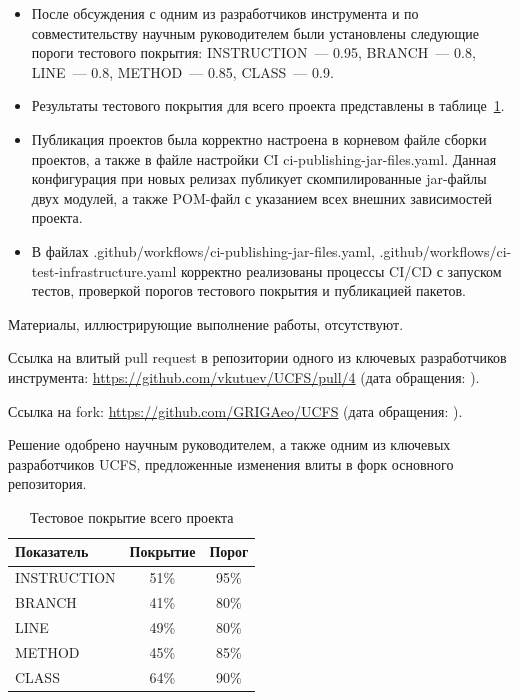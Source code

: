 \documentclass[a4paper]{article}
\begin{document}
\begin{itemize}
    \item После обсуждения с одним из разработчиков инструмента и по совместительству научным руководителем были установлены следующие пороги тестового покрытия: INSTRUCTION~--- 0.95, BRANCH~--- 0.8, LINE~--- 0.8, METHOD~--- 0.85, CLASS~--- 0.9.
    \item Результаты тестового покрытия для всего проекта представлены в таблице~\ref{tab:solver-coverage}.
    \item Публикация проектов была корректно настроена в корневом файле сборки проектов, а также в файле настройки CI ci-publishing-jar-files.yaml. Данная конфигурация при новых релизах публикует скомпилированные jar-файлы двух модулей, а также POM-файл с указанием всех внешних зависимостей проекта.
    \item В файлах .github/workflows/ci-publishing-jar-files.yaml, .github/workflows/ci-test-infrastructure.yaml корректно реализованы процессы CI/CD с запуском тестов, проверкой порогов тестового покрытия и публикацией пакетов. 
\end{itemize}

Материалы, иллюстрирующие выполнение работы, отсутствуют.

Ссылка на влитый pull request в репозитории одного из ключевых разработчиков инструмента: \url{https://github.com/vkutuev/UCFS/pull/4} (дата обращения: ).

Ссылка на fork: \url{https://github.com/GRIGAeo/UCFS} (дата обращения: ).

Решение одобрено научным руководителем, а также одним из ключевых разработчиков UCFS, предложенные изменения влиты в форк основного репозитория.

\begin{table}[H]
\centering
\begin{tabular}{|l|c|c|}
\hline
Показатель & Покрытие & Порог \\
\hline
INSTRUCTION & 51\% & 95\% \\
BRANCH      & 41\% & 80\% \\
LINE        & 49\% & 80\% \\
METHOD      & 45\% & 85\% \\
CLASS       & 64\% & 90\% \\
\hline
\end{tabular}
\caption{Тестовое покрытие всего проекта}
\label{tab:solver-coverage}
\end{table}
\end{document}

